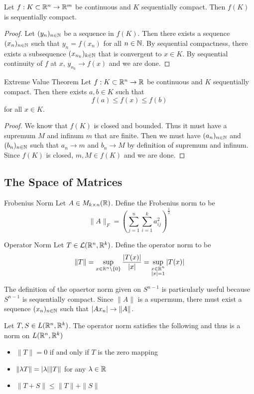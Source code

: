 \documentclass[a4paper]{article}
\begin{document}
\begin{thm}{}{} Let $f:K\subset\mathbb{R}^n\to\mathbb{R}^m$ be continuous and $K$ sequentially compact. Then $f(K)$ is sequentially compact. 
\begin{proof}
Let $(y_n)_{n\in\mathbb{N}}$ be a sequence in $f(K)$. Then there exists a sequence $(x_n)_{n\in\mathbb{N}}$ such that $y_n=f(x_n)$ for all $n\in\mathbb{N}$. By sequential compactness, there exists a subsequence $(x_{n_k})_{k\in\mathbb{N}}$ that is convergent to $x\in K$. By sequential continuity of $f$ at $x$, $y_{n_k}\to f(x)$ and we are done. 
\end{proof}
\end{thm}

\begin{thm}{Extreme Value Theorem}{} Let $f:K\subset\mathbb{R}^n\to\mathbb{R}$ be continuous and $K$ sequentially compact. Then there exists $a,b\in K$ such that $$f(a)\leq f(x)\leq f(b)$$ for all $x\in K$. 
\begin{proof}
We know that $f(K)$ is closed and bounded. Thus it must have a supremum $M$ and infinum $m$ that are finite. Then we must have $(a_n)_{n\in\mathbb{N}}$ and $(b_n)_{n\in\mathbb{N}}$ such that $a_n\to m$ and $b_n\to M$ by definition of supremum and infinum. Since $f(K)$ is closed, $m,M\in f(K)$ and we are done. 
\end{proof}
\end{thm}

\subsection{The Space of Matrices}
\begin{defn}{Frobenius Norm}{} Let $A\in M_{k\times n}(\mathbb{R})$. Define the Frobenius norm to be $$\|A\|_F=\left(\sum_{j=1}^n\sum_{i=1}^ka_{ij}^2\right)^{\frac{1}{2}}$$
\end{defn}

\begin{defn}{Operator Norm}{} Let $T\in\mathcal{L}(\mathbb{R}^n,\mathbb{R}^k)$. Define the operator norm to be $$\|T\|=\sup_{x\in\mathbb{R}^n\setminus\{0\}}\frac{\abs{T(x)}}{\abs{x}}=\sup_{\substack{x\in\mathbb{R}^n\\\abs{x}=1}}\abs{T(x)}$$
\end{defn}

The definition of the opaertor norm given on $S^{n-1}$ is particularly useful because $S^{n-1}$ is sequentially compact. Since $\|A\|$ is a supermum, there must exist a sequence $(x_n)_{n\in\mathbb{N}}$ such that $\abs{Ax_n}\to\|A\|$. 

\begin{prp}{}{} Let $T,S\in L(\mathbb{R}^n,\mathbb{R}^k)$. The operator norm satisfies the following and thus is a norm on $L(\mathbb{R}^n,\mathbb{R}^k)$
\begin{itemize}
\item $\|T\|=0$ if and only if $T$ is the zero mapping
\item $\|\lambda T\|=\abs{\lambda}\|T\|$ for any $\lambda\in\mathbb{R}$
\item $\|T+S\|\leq\|T\|+\|S\|$
\end{itemize}
\end{prp}
\end{document}
